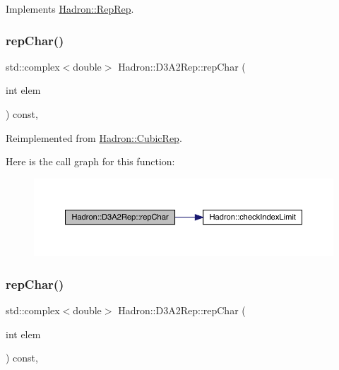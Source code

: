 Implements \mbox{\hyperlink{structHadron_1_1RepRep_ab3213025f6de249f7095892109575fde}{Hadron\+::\+Rep\+Rep}}.

\mbox{\label{structHadron_1_1D3A2Rep_a89c199bea81c3c1da8687a5cbd7498c0}} 
\subsubsection{\texorpdfstring{repChar()}{repChar()}\hspace{0.1cm}{\footnotesize\ttfamily [1/3]}}
{\footnotesize\ttfamily std\+::complex$<$double$>$ Hadron\+::\+D3\+A2\+Rep\+::rep\+Char (\begin{DoxyParamCaption}\item[{int}]{elem }\end{DoxyParamCaption}) const\hspace{0.3cm}{\ttfamily [inline]}, {\ttfamily [virtual]}}



Reimplemented from \mbox{\hyperlink{structHadron_1_1CubicRep_af45227106e8e715e84b0af69cd3b36f8}{Hadron\+::\+Cubic\+Rep}}.

Here is the call graph for this function\+:
\nopagebreak
\begin{figure}[H]
\begin{center}
\leavevmode
\includegraphics[width=350pt]{d5/d7f/structHadron_1_1D3A2Rep_a89c199bea81c3c1da8687a5cbd7498c0_cgraph}
\end{center}
\end{figure}
\mbox{\label{structHadron_1_1D3A2Rep_a89c199bea81c3c1da8687a5cbd7498c0}} 
\subsubsection{\texorpdfstring{repChar()}{repChar()}\hspace{0.1cm}{\footnotesize\ttfamily [2/3]}}
{\footnotesize\ttfamily std\+::complex$<$double$>$ Hadron\+::\+D3\+A2\+Rep\+::rep\+Char (\begin{DoxyParamCaption}\item[{int}]{elem }\end{DoxyParamCaption}) const\hspace{0.3cm}{\ttfamily [inline]}, {\ttfamily [virtual]}}



